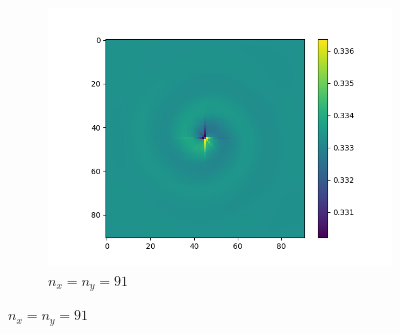\documentclass{beamer}
\begin{document}
\begin{frame}[fragile]
\begin{figure}
\begin{subfigure}{0.32\textwidth}
\centering
\includegraphics[width=\textwidth]{img/P_001_nxy91.png}
\caption{$n_{x}=n_{y}=91$}
\end{subfigure}
\end{figure}

\end{frame}
\end{document}
